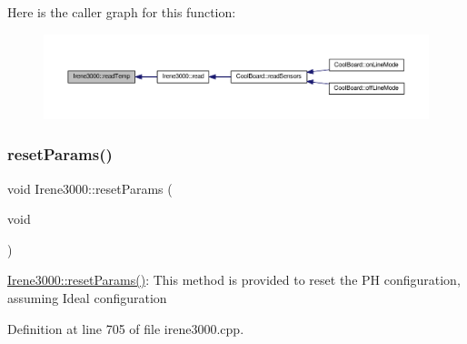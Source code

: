 Here is the caller graph for this function\+:\nopagebreak
\begin{figure}[H]
\begin{center}
\leavevmode
\includegraphics[width=350pt]{d6/d03/class_irene3000_a80bc6dfea106dc3bc54fa20204d4d5dc_icgraph}
\end{center}
\end{figure}
\mbox{\label{class_irene3000_a43b0e44f8d211413ff4e3a0c654205ff}} 
\subsubsection{\texorpdfstring{reset\+Params()}{resetParams()}}
{\footnotesize\ttfamily void Irene3000\+::reset\+Params (\begin{DoxyParamCaption}\item[{void}]{ }\end{DoxyParamCaption})}

\hyperlink{class_irene3000_a43b0e44f8d211413ff4e3a0c654205ff}{Irene3000\+::reset\+Params()}\+: This method is provided to reset the PH configuration, assuming Ideal configuration 

Definition at line 705 of file irene3000.\+cpp.


